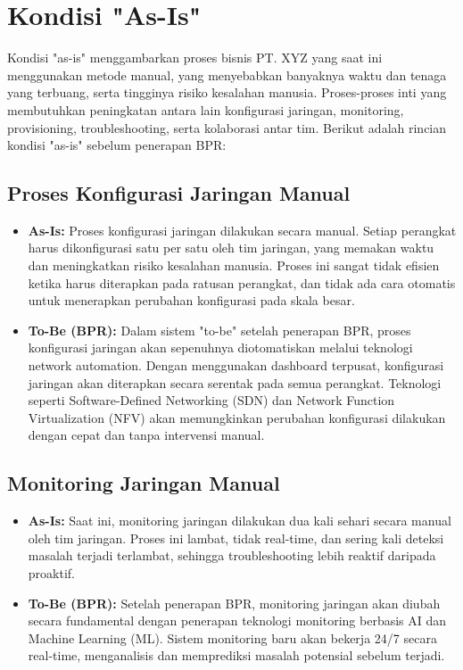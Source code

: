 \section{Kondisi "As-Is"}
Kondisi "as-is" menggambarkan proses bisnis PT. XYZ yang saat ini menggunakan metode manual, yang menyebabkan banyaknya waktu dan tenaga yang terbuang, serta tingginya risiko kesalahan manusia. Proses-proses inti yang membutuhkan peningkatan antara lain konfigurasi jaringan, monitoring, provisioning, troubleshooting, serta kolaborasi antar tim. Berikut adalah rincian kondisi "as-is" sebelum penerapan BPR:

\subsection{Proses Konfigurasi Jaringan Manual}
\begin{itemize}
    \item \textbf{As-Is:} Proses konfigurasi jaringan dilakukan secara manual. Setiap perangkat harus dikonfigurasi satu per satu oleh tim jaringan, yang memakan waktu dan meningkatkan risiko kesalahan manusia. Proses ini sangat tidak efisien ketika harus diterapkan pada ratusan perangkat, dan tidak ada cara otomatis untuk menerapkan perubahan konfigurasi pada skala besar.
    
    \item \textbf{To-Be (BPR):} Dalam sistem "to-be" setelah penerapan BPR, proses konfigurasi jaringan akan sepenuhnya diotomatiskan melalui teknologi network automation. Dengan menggunakan dashboard terpusat, konfigurasi jaringan akan diterapkan secara serentak pada semua perangkat. Teknologi seperti Software-Defined Networking (SDN) dan Network Function Virtualization (NFV) akan memungkinkan perubahan konfigurasi dilakukan dengan cepat dan tanpa intervensi manual.
\end{itemize}

\subsection{Monitoring Jaringan Manual}
\begin{itemize}
    \item \textbf{As-Is:} Saat ini, monitoring jaringan dilakukan dua kali sehari secara manual oleh tim jaringan. Proses ini lambat, tidak real-time, dan sering kali deteksi masalah terjadi terlambat, sehingga troubleshooting lebih reaktif daripada proaktif.
    
    \item \textbf{To-Be (BPR):} Setelah penerapan BPR, monitoring jaringan akan diubah secara fundamental dengan penerapan teknologi monitoring berbasis AI dan Machine Learning (ML). Sistem monitoring baru akan bekerja 24/7 secara real-time, menganalisis dan memprediksi masalah potensial sebelum terjadi.
\end{itemize}

